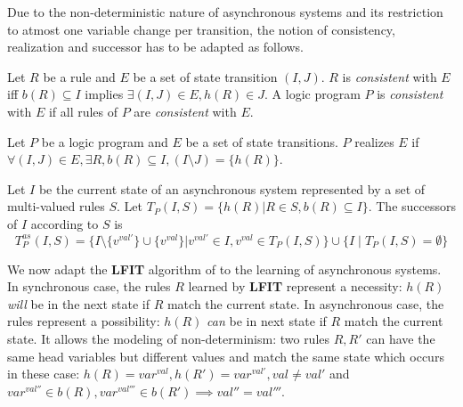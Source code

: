 Due to the non-deterministic nature of asynchronous systems and its restriction to atmost one variable change per transition,
the notion of consistency, realization and successor has to be adapted as follows.

\begin{definition}[Consistency]
	Let $R$ be a rule and $E$ be a set of state transition $(I,J)$.
	$R$ is {\it consistent} with $E$ iff
	$b(R)\subseteq I$ implies $\exists (I,J) \in E, h(R) \in J$.
	A logic program $P$ is {\it consistent} with $E$ if all rules of $P$ are {\it consistent} with $E$.
\end{definition}

\begin{definition}
	Let $P$ be a logic program and $E$ be a set of state transitions.
	$P$ realizes $E$ if $\forall (I,J) \in E, \exists R, b(R) \subseteq I, (I \setminus J) = \{h(R)\}$.
\end{definition}

\begin{definition}
	Let $I$ be the current state of an asynchronous system represented by a set of multi-valued rules $S$.
	Let $T_P(I,S) = \{h(R) | R \in S, b(R) \subseteq I\}$.
	The successors of $I$ according to $S$ is
	$$T_P^{as}(I,S) = \{I \setminus \{v^{val'}\} \cup \{v^{val}\} | v^{val'} \in I, v^{val} \in T_P(I,S)\} \cup \{I \mid T_P(I,S) = \emptyset\}$$ %
\end{definition}

We now adapt the {\bf LFIT} algorithm of \cite{ribeiro2015learning} to the learning of asynchronous systems.
In synchronous case, the rules $R$ learned by {\bf LFIT} represent a necessity: $h(R)$ \textit{will} be in the next state if $R$ match the current state.
In asynchronous case, the rules represent a possibility: $h(R)$ \textit{can} be in next state if $R$ match the current state.
It allows the modeling of non-determinism: two rules $R, R'$ can have the same head variables but different values and match the same state which occurs in these case:
$h(R)=var^{val}, h(R')=var^{val'}, val \neq val'$ and $var^{val''} \in b(R), var^{val'''}\in b(R') \implies val'' = val'''$.

